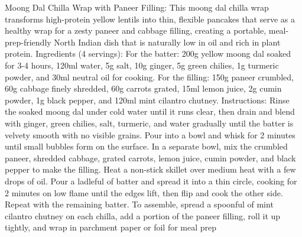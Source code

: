 Moong Dal Chilla Wrap with Paneer Filling: This moong dal chilla wrap transforms high-protein yellow lentils into thin, flexible pancakes that serve as a healthy wrap for a zesty paneer and cabbage filling, creating a portable, meal-prep-friendly North Indian dish that is naturally low in oil and rich in plant protein. Ingredients (4 servings): For the batter: 200g yellow moong dal soaked for 3-4 hours, 120ml water, 5g salt, 10g ginger, 5g green chilies, 1g turmeric powder, and 30ml neutral oil for cooking. For the filling: 150g paneer crumbled, 60g cabbage finely shredded, 60g carrots grated, 15ml lemon juice, 2g cumin powder, 1g black pepper, and 120ml mint cilantro chutney. Instructions: Rinse the soaked moong dal under cold water until it runs clear, then drain and blend with ginger, green chilies, salt, turmeric, and water gradually until the batter is velvety smooth with no visible grains. Pour into a bowl and whisk for 2 minutes until small bubbles form on the surface. In a separate bowl, mix the crumbled paneer, shredded cabbage, grated carrots, lemon juice, cumin powder, and black pepper to make the filling. Heat a non-stick skillet over medium heat with a few drops of oil. Pour a ladleful of batter and spread it into a thin circle, cooking for 2 minutes on low flame until the edges lift, then flip and cook the other side. Repeat with the remaining batter. To assemble, spread a spoonful of mint cilantro chutney on each chilla, add a portion of the paneer filling, roll it up tightly, and wrap in parchment paper or foil for meal prep
\par

